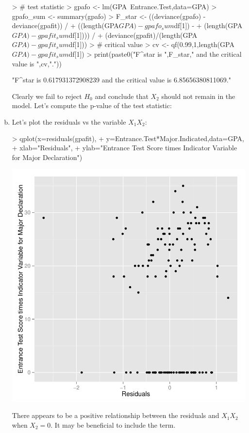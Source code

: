 \documentclass{article}
\begin{document}
\begin{enumerate}[a)]
\begin{Schunk}
\begin{Sinput}
> # test statistic
> gpafo <- lm(GPA~Entrance.Test,data=GPA)
> gpafo_sum <- summary(gpafo)
> F_star <- ((deviance(gpafo) - deviance(gpafit)) /
+   ((length(GPA$GPA) - gpafo_sum$df[1]) - 
+      (length(GPA$GPA) - gpafit_sum$df[1]))) /
+   (deviance(gpafit)/(length(GPA$GPA) - gpafit_sum$df[1]))
> # critical value
> cv <- qf(0.99,1,length(GPA$GPA)-gpafit_sum$df[1])
> print(paste0("F^star is ",F_star," and the critical value is ",cv,"."))
\end{Sinput}
\begin{Soutput}
[1] "F^star is 0.617931372908239 and the critical value is 6.85656380811069."
\end{Soutput}
\end{Schunk}

Clearly we fail to reject $H_0$ and conclude that $X_2$ should not remain in the model. Let's compute the p-value of the test statistic:

\item{} Let's plot the residuals vs the variable $X_1X_2$:

\begin{Schunk}
\begin{Sinput}
> qplot(x=residuals(gpafit),
+       y=Entrance.Test*Major.Indicated,data=GPA,
+       xlab="Residuals",
+       ylab="Entrance Test Score times Indicator Variable for Major Declaration")
\end{Sinput}
\end{Schunk}
\includegraphics{Fig-moreresplots}

There appears to be a positive relationship between the residuals and $X_1X_2$ when $X_2 = 0$. It may be beneficial to include the term.

\end{enumerate}
\end{document}
